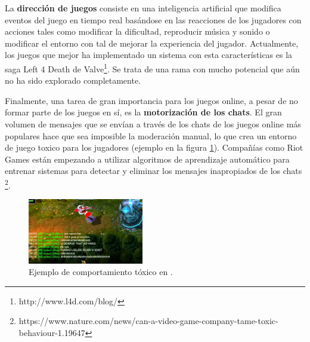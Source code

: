 La \textbf{dirección de juegos} consiste en una inteligencia artificial que modifica eventos del juego en tiempo real basándose en las reacciones de los jugadores con acciones tales como modificar la dificultad, reproducir música y sonido o modificar el entorno con tal de mejorar la experiencia del jugador. Actualmente, los juegos que mejor ha implementado un sistema con esta características es la saga Left 4 Death de Valve\footnote{http://www.l4d.com/blog/}. Se trata de una rama con mucho potencial que aún no ha sido explorado completamente.

Finalmente, una tarea de gran importancia para los juegos online, a pesar de no formar parte de los juegos en sí, es la \textbf{motorización de los chats}. El gran volumen de mensajes que se envían a través de los chats de los juegos online más populares hace que sea imposible la moderación manual, lo que crea un entorno de juego toxico para los jugadores (ejemplo en la figura \ref{lol-toxic-capture}). Compañías como Riot Games están empezando a utilizar algoritmos de aprendizaje automático para entrenar sistemas para detectar y eliminar los mensajes inapropiados de los chats \footnote{https://www.nature.com/news/can-a-video-game-company-tame-toxic-behaviour-1.19647}.

\begin{figure}[h]
	\includegraphics[width=0.45\textwidth]{images/estadodelarte/ai/lol-toxic-capture}
	\centering
	\caption{Ejemplo de comportamiento tóxico en .}
	\label{lol-toxic-capture}
\end{figure}
